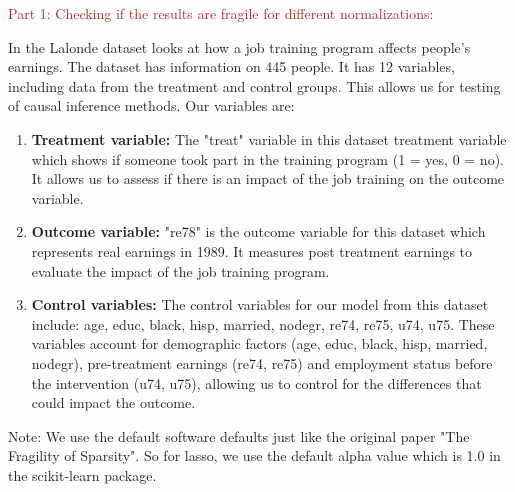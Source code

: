\textcolor{brown}{Part 1: Checking if the results are fragile for different normalizations: }

In the Lalonde dataset looks at how a job training program affects people's earnings. The dataset has information on 445 people. It has 12 variables, including data from the treatment and control groups. This allows us for testing of causal inference methods. Our variables are:
\begin{enumerate}
    \item \textbf{Treatment variable:} The "treat" variable in this dataset treatment variable which shows if someone took part in the training program (1 = yes, 0 = no). It allows us to assess if there is an impact of the job training on the outcome variable. 
    \item \textbf{Outcome variable:} "re78" is the outcome variable for this dataset which represents real earnings in 1989. It measures post treatment earnings to evaluate the impact of the job training program. 
    \item \textbf{Control variables:} The control variables for our model from this dataset include: age, educ, black, hisp, married, nodegr, re74, re75, u74, u75. These variables account for demographic factors (age, educ, black, hisp, married, nodegr), pre-treatment earnings (re74, re75) and employment status before the intervention (u74, u75), allowing us to control for the differences that could impact the outcome. 
\end{enumerate}

Note: We use the default software defaults just like the original paper "The Fragility of Sparsity". So for lasso, we use the default alpha value which is 1.0 in the scikit-learn package. 


